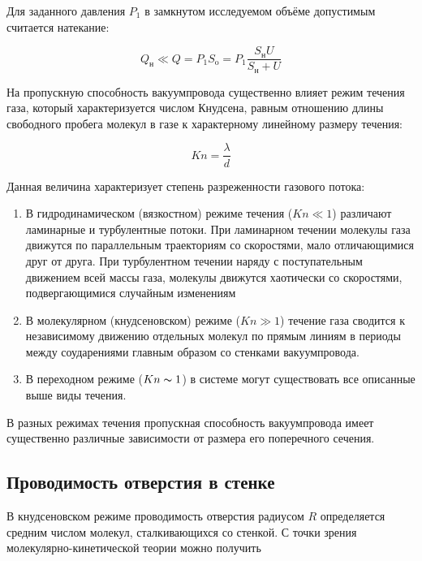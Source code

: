 \documentclass[a4paper, 12pt]{article} %
\begin{document}
Для заданного давления $P_1$ в замкнутом исследуемом объёме допустимым считается натекание:

\begin{equation}
	Q_{\text{н}} \ll Q = P_1 S_{\text{o}} = P_1 \frac{S_{\text{н}} U}{S_{\text{н}} + U}
\end{equation}

На пропускную способность вакуумпровода существенно влияет
режим течения газа, который характеризуется числом Кнудсена, равным
отношению длины свободного пробега молекул в газе к характерному
линейному размеру течения:

\begin{equation}
	Kn = \frac{\lambda}{d}
\end{equation}

Данная величина характеризует степень разреженности газового
потока:
\begin{enumerate}

	\item В гидродинамическом (вязкостном) режиме течения ($Kn \ll 1$)
различают ламинарные и турбулентные потоки. При ламинарном
течении молекулы газа движутся по параллельным траекториям
со скоростями, мало отличающимися друг от друга. При турбулентном течении наряду с поступательным движением всей массы газа, молекулы движутся хаотически со скоростями, подвергающимися случайным изменениям

	\item В молекулярном (кнудсеновском) режиме ($Kn \gg 1$) течение газа
сводится к независимому движению отдельных молекул по прямым линиям в периоды между соударениями главным образом со
стенками вакуумпровода.

	\item В переходном режиме ($Kn \thicksim 1$) в системе могут существовать все
описанные выше виды течения.

\end{enumerate}

В разных режимах течения пропускная способность вакуумпровода имеет существенно различные зависимости от размера его поперечного сечения.

\subsection{Проводимость отверстия в стенке}

В кнудсеновском режиме проводимость отверстия радиусом $R$
определяется средним числом молекул, сталкивающихся со стенкой. С точки зрения молекулярно-кинетической теории можно получить
\end{document}
